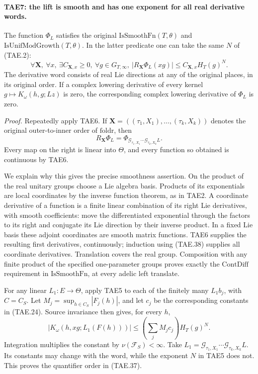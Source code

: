 \paragraph{TAE7: the lift is smooth and has one exponent for all real derivative words.}
\label{claim:TAE7}
The function \(\Phi_L\) satisfies the original
\(\mathrm{IsSmoothFn}(T,\theta)\) and
\(\mathrm{IsUnifModGrowth}(T,\theta)\).  In the latter
predicate one can take the same \(N\) of (TAE.2):
\[
 \forall\mathbf X,\ \forall x,\ \exists C_{\mathbf X,x}\ge0,\
 \forall g\in G_{T,\infty},\
 \bigl|R_{\mathbf X}\Phi_L(xg)\bigr|
                 \le C_{\mathbf X,x}H_T(g)^N .
 \tag{TAE.37}
\]
The derivative word consists of real Lie directions at any
of the original places, in its original order.
If a complex lowering derivative of every kernel
\(g\mapsto K_\omega(h,g;Lz)\) is zero, the corresponding
complex lowering derivative of \(\Phi_L\) is zero.

\emph{Proof.}
Repeatedly apply TAE6.  If
\(\mathbf X=((\tau_1,X_1),\ldots,(\tau_k,X_k))\) denotes
the original outer-to-inner order of \(\mathrm{foldr}\),
then
\[
 R_{\mathbf X}\Phi_L
   =\Phi_{\mathcal G_{\tau_1,X_1}\cdots
                     \mathcal G_{\tau_k,X_k}L}.
 \tag{TAE.38}
\]
Every map on the right is linear into \(\Theta\), and every
function so obtained is continuous by TAE6.

We explain why this gives the precise smoothness assertion.
On the product of the real unitary groups choose a Lie algebra
basis.  Products of its exponentials are local coordinates by
the inverse function theorem, as in TAE2.  A coordinate
derivative of a function is a finite linear combination of
its right Lie derivatives, with smooth coefficients: move
the differentiated exponential through the factors to its
right and conjugate its Lie direction by their inverse
product.  In a fixed Lie basis these adjoint coordinates
are smooth matrix functions.  TAE6 supplies the resulting
first derivatives, continuously; induction using (TAE.38)
supplies all coordinate derivatives.  Translation covers
the real group.  Composition with any finite product of
the specified one-parameter groups proves exactly the
\(\mathrm{ContDiff}\) requirement in \(\mathrm{IsSmoothFn}\),
at every adelic left translate.

For any linear \(L_1:E\to\Theta\), apply TAE5 to each
of the finitely many \(L_1b_j\), with \(C=C_S\).
Let \(M_j=\sup_{h\in C_S}|F_j(h)|\), and let \(c_j\)
be the corresponding constants in (TAE.24).
Source invariance then gives, for every \(h\),
\[
 |K_\omega(h,xg;L_1(F(h)))|
       \le\left(\sum_j M_jc_j\right)H_T(g)^N.
 \tag{TAE.39}
\]
Integration multiplies the constant by
\(\nu(\mathcal F_S)<\infty\).  Take
\(L_1=\mathcal G_{\tau_1,X_1}\cdots
\mathcal G_{\tau_k,X_k}L\).  Its constants may change
with the word, while the exponent \(N\) in TAE5 does not.
This proves the quantifier order in (TAE.37).

